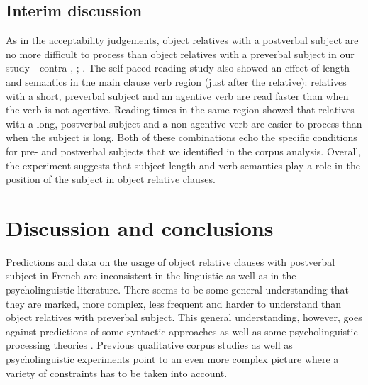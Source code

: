 \documentclass[output=paper]{langscibook}
\begin{document}
 
 
 
\subsection{Interim discussion}
As in the acceptability judgements, object relatives with a postverbal subject are no more difficult to process than object relatives with a preverbal subject in our study - contra \citet{Holmes1981}, \citet{baudiffier2011effect}; \citet{pozniak2015processing}. The self-paced reading study also showed an effect of length and semantics in the main clause verb region (just after the relative): relatives with a short, preverbal subject and an agentive verb are read faster than when the verb is not agentive. Reading times in the same region showed that relatives with a long, postverbal subject and a non-agentive verb are easier to process than when the subject is long. Both of these combinations echo the specific conditions for pre- and postverbal subjects that we identified in the corpus analysis. Overall, the experiment suggests that subject length and verb semantics play a role in the position of the subject in object relative clauses. 

\section{Discussion and conclusions}

Predictions and data on the usage of object relative clauses with postverbal subject in French are inconsistent in the linguistic as well as in the psycholinguistic literature. There seems to be some general understanding that they are marked, more complex, less frequent and harder to understand than object relatives with preverbal subject. This general understanding, however, goes against predictions of some syntactic approaches \citep [e.g. Relativized Minimality,] []{rizzi1990} as well as some psycholinguistic processing theories \citep [e.g. DLT,] []{gibson2000}. Previous qualitative corpus studies \citep{catherine1997} as well as psycholinguistic experiments point to an even more complex picture where a variety of constraints has to be taken into account.\\ 
\end{document}
